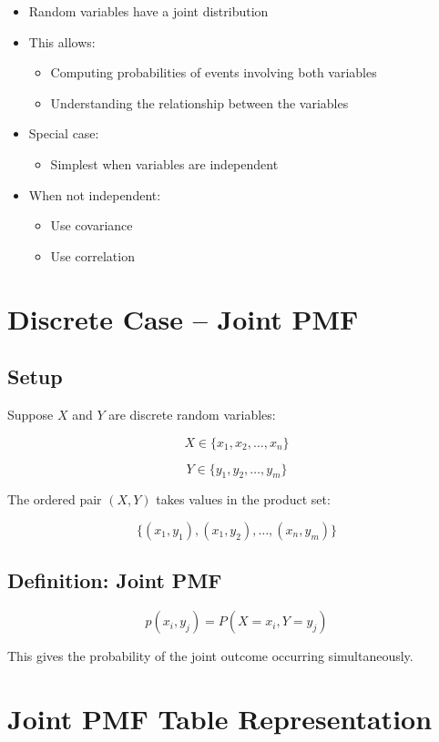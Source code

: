 \documentclass[12pt]{article}
\begin{document}
\begin{itemize}
\item Random variables have a joint distribution
\item This allows:
\begin{itemize}
\item Computing probabilities of events involving both variables
\item Understanding the relationship between the variables
\end{itemize}
\item Special case:
\begin{itemize}
\item Simplest when variables are independent
\end{itemize}
\item When not independent:
\begin{itemize}
\item Use covariance
\item Use correlation
\end{itemize}
\end{itemize}

\section{Discrete Case -- Joint PMF}

\subsection{Setup}

Suppose $X$ and $Y$ are discrete random variables:

\[
X \in \{x_1, x_2, \ldots, x_n\}
\]

\[
Y \in \{y_1, y_2, \ldots, y_m\}
\]

The ordered pair $(X,Y)$ takes values in the product set:

\[
\{(x_1,y_1), (x_1,y_2), \ldots, (x_n,y_m)\}
\]

\subsection{Definition: Joint PMF}

\[
p(x_i, y_j) = P(X = x_i, Y = y_j)
\]

This gives the probability of the joint outcome occurring simultaneously.

\section{Joint PMF Table Representation}
\end{document}
